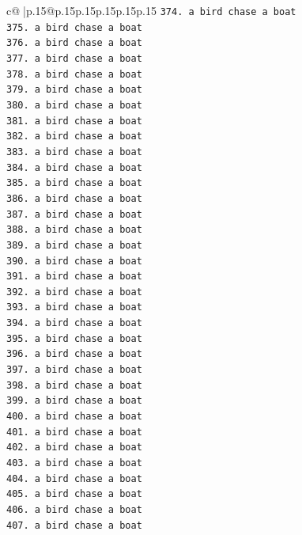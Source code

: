 \documentclass{article}
\begin{document}
{\begin{supertabular}{c@{$\;$}|p{.15\linewidth}@{}p{.15\linewidth}p{.15\linewidth}p{.15\linewidth}p{.15\linewidth}p{.15\linewidth}}
{{{\texttt{374. a bird chase a boat} \\
\texttt{375. a bird chase a boat} \\
\texttt{376. a bird chase a boat} \\
\texttt{377. a bird chase a boat} \\
\texttt{378. a bird chase a boat} \\
\texttt{379. a bird chase a boat} \\
\texttt{380. a bird chase a boat} \\
\texttt{381. a bird chase a boat} \\
\texttt{382. a bird chase a boat} \\
\texttt{383. a bird chase a boat} \\
\texttt{384. a bird chase a boat} \\
\texttt{385. a bird chase a boat} \\
\texttt{386. a bird chase a boat} \\
\texttt{387. a bird chase a boat} \\
\texttt{388. a bird chase a boat} \\
\texttt{389. a bird chase a boat} \\
\texttt{390. a bird chase a boat} \\
\texttt{391. a bird chase a boat} \\
\texttt{392. a bird chase a boat} \\
\texttt{393. a bird chase a boat} \\
\texttt{394. a bird chase a boat} \\
\texttt{395. a bird chase a boat} \\
\texttt{396. a bird chase a boat} \\
\texttt{397. a bird chase a boat} \\
\texttt{398. a bird chase a boat} \\
\texttt{399. a bird chase a boat} \\
\texttt{400. a bird chase a boat} \\
\texttt{401. a bird chase a boat} \\
\texttt{402. a bird chase a boat} \\
\texttt{403. a bird chase a boat} \\
\texttt{404. a bird chase a boat} \\
\texttt{405. a bird chase a boat} \\
\texttt{406. a bird chase a boat} \\
\texttt{407. a bird chase a boat} \\
}}}
\end{supertabular}}
\end{document}
